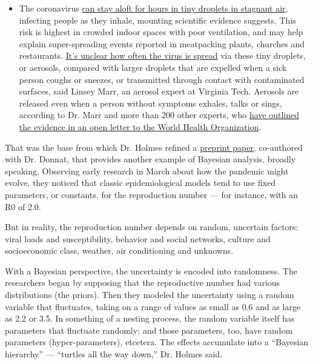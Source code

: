 \begin{itemize}
  \begin{itemize}
  \tightlist
  \item
    The coronavirus
    \href{https://www.nytimes.com/2020/07/04/health/239-experts-with-one-big-claim-the-coronavirus-is-airborne.html?action=click\&pgtype=Article\&state=default\&region=MAIN_CONTENT_3\&context=storylines_faq}{can
    stay aloft for hours in tiny droplets in stagnant air}, infecting
    people as they inhale, mounting scientific evidence suggests. This
    risk is highest in crowded indoor spaces with poor ventilation, and
    may help explain super-spreading events reported in meatpacking
    plants, churches and restaurants.
    \href{https://www.nytimes.com/2020/07/06/health/coronavirus-airborne-aerosols.html?action=click\&pgtype=Article\&state=default\&region=MAIN_CONTENT_3\&context=storylines_faq}{It's
    unclear how often the virus is spread} via these tiny droplets, or
    aerosols, compared with larger droplets that are expelled when a
    sick person coughs or sneezes, or transmitted through contact with
    contaminated surfaces, said Linsey Marr, an aerosol expert at
    Virginia Tech. Aerosols are released even when a person without
    symptoms exhales, talks or sings, according to Dr. Marr and more
    than 200 other experts, who
    \href{https://academic.oup.com/cid/article/doi/10.1093/cid/ciaa939/5867798}{have
    outlined the evidence in an open letter to the World Health
    Organization}.
  \end{itemize}
\end{itemize}

That was the base from which Dr. Holmes refined a
\href{https://arxiv.org/abs/2004.05272}{preprint paper}, co-authored
with Dr. Donnat, that provides another example of Bayesian analysis,
broadly speaking. Observing early research in March about how the
pandemic might evolve, they noticed that classic epidemiological models
tend to use fixed parameters, or constants, for the reproduction number
--- for instance, with an R0 of 2.0.

But in reality, the reproduction number depends on random, uncertain
factors: viral loads and susceptibility, behavior and social networks,
culture and socioeconomic class, weather, air conditioning and unknowns.

With a Bayesian perspective, the uncertainty is encoded into randomness.
The researchers began by supposing that the reproductive number had
various distributions (the priors). Then they modeled the uncertainty
using a random variable that fluctuates, taking on a range of values as
small as 0.6 and as large as 2.2 or 3.5. In something of a nesting
process, the random variable itself has parameters that fluctuate
randomly; and those parameters, too, have random parameters
(hyper-parameters), etcetera. The effects accumulate into a ``Bayesian
hierarchy'' --- ``turtles all the way down,'' Dr. Holmes said.

